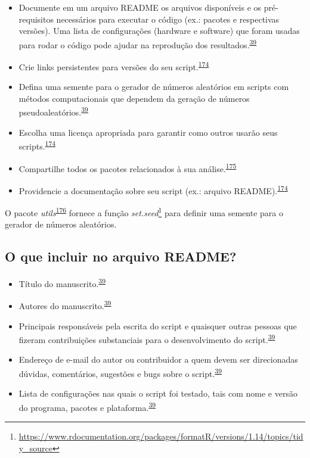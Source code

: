 \documentclass[
  a4paper,
]{book}
\renewcommand{\href}[2]{#2\footnote{\url{#1}}}
\newenvironment{infobox}[1]
  {
  \begin{itemize}
  \renewcommand{\labelitemi}{
    \raisebox{-.7\height}[0pt][0pt]{
      {\setkeys{Gin}{width=3em,keepaspectratio}
        \texttt{[image: \#1]}}
    }
  }
  \setlength{\fboxsep}{1em}
  \begin{blackbox}
  \item
  }
  {
  \end{blackbox}
  \end{itemize}
  }
\begin{document}
\begin{itemize}
\item
  Documente em um arquivo README os arquivos disponíveis e os pré-requisitos necessários para executar o código (ex.: pacotes e respectivas versões). Uma lista de configurações (hardware e software) que foram usadas para rodar o código pode ajudar na reprodução dos resultados.\textsuperscript{\protect\hyperlink{ref-hofner2015}{39}}
\item
  Crie links persistentes para versões do seu script.\textsuperscript{\protect\hyperlink{ref-Eglen2017}{174}}
\item
  Defina uma semente para o gerador de números aleatórios em scripts com métodos computacionais que dependem da geração de números pseudoaleatórios.\textsuperscript{\protect\hyperlink{ref-hofner2015}{39}}
\item
  Escolha uma licença apropriada para garantir como outros usarão seus scripts.\textsuperscript{\protect\hyperlink{ref-Eglen2017}{174}}
\item
  Compartilhe todos os pacotes relacionados à sua análise.\textsuperscript{\protect\hyperlink{ref-Zhao2023}{175}}
\item
  Providencie a documentação sobre seu script (ex.: arquivo README).\textsuperscript{\protect\hyperlink{ref-Eglen2017}{174}}
\end{itemize}

\begin{infobox}{images/Rlogo}
O pacote \emph{utils}\textsuperscript{\protect\hyperlink{ref-utils}{176}} fornece a função \href{https://www.rdocumentation.org/packages/formatR/versions/1.14/topics/tidy_source}{\emph{set.seed}} para definir uma semente para o gerador de números aleatórios.

\end{infobox}

\hypertarget{o-que-incluir-no-arquivo-readme}{%
\subsection{O que incluir no arquivo README?}\label{o-que-incluir-no-arquivo-readme}}

\begin{itemize}
\item
  Título do manuscrito.\textsuperscript{\protect\hyperlink{ref-hofner2015}{39}}
\item
  Autores do manuscrito.\textsuperscript{\protect\hyperlink{ref-hofner2015}{39}}
\item
  Principais responsáveis pela escrita do script e quaisquer outras pessoas que fizeram contribuições substanciais para o desenvolvimento do script.\textsuperscript{\protect\hyperlink{ref-hofner2015}{39}}
\item
  Endereço de e-mail do autor ou contribuidor a quem devem ser direcionadas dúvidas, comentários, sugestões e bugs sobre o script.\textsuperscript{\protect\hyperlink{ref-hofner2015}{39}}
\item
  Lista de configurações nas quais o script foi testado, tais com nome e versão do programa, pacotes e plataforma.\textsuperscript{\protect\hyperlink{ref-hofner2015}{39}}
\end{itemize}
\end{document}
